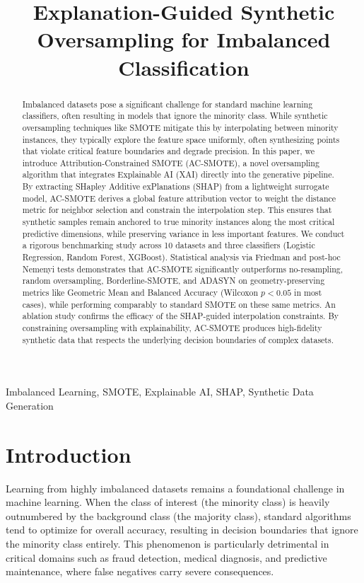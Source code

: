 \documentclass[conference,a4paper]{IEEEtran}
\begin{document}
\title{Explanation-Guided Synthetic Oversampling for Imbalanced Classification}

\author{}

\maketitle

\begin{abstract}
Imbalanced datasets pose a significant challenge for standard machine learning classifiers, often resulting in models that ignore the minority class. While synthetic oversampling techniques like SMOTE mitigate this by interpolating between minority instances, they typically explore the feature space uniformly, often synthesizing points that violate critical feature boundaries and degrade precision. In this paper, we introduce Attribution-Constrained SMOTE (AC-SMOTE), a novel oversampling algorithm that integrates Explainable AI (XAI) directly into the generative pipeline. By extracting SHapley Additive exPlanations (SHAP) from a lightweight surrogate model, AC-SMOTE derives a global feature attribution vector to weight the distance metric for neighbor selection and constrain the interpolation step. This ensures that synthetic samples remain anchored to true minority instances along the most critical predictive dimensions, while preserving variance in less important features. We conduct a rigorous benchmarking study across 10 datasets and three classifiers (Logistic Regression, Random Forest, XGBoost). Statistical analysis via Friedman and post-hoc Nemenyi tests demonstrates that AC-SMOTE significantly outperforms no-resampling, random oversampling, Borderline-SMOTE, and ADASYN on geometry-preserving metrics like Geometric Mean and Balanced Accuracy (Wilcoxon $p < 0.05$ in most cases), while performing comparably to standard SMOTE on these same metrics. An ablation study confirms the efficacy of the SHAP-guided interpolation constraints. By constraining oversampling with explainability, AC-SMOTE produces high-fidelity synthetic data that respects the underlying decision boundaries of complex datasets.
\end{abstract}

\begin{IEEEkeywords}
Imbalanced Learning, SMOTE, Explainable AI, SHAP, Synthetic Data Generation
\end{IEEEkeywords}

\section{Introduction}
Learning from highly imbalanced datasets remains a foundational challenge in machine learning. When the class of interest (the minority class) is heavily outnumbered by the background class (the majority class), standard algorithms tend to optimize for overall accuracy, resulting in decision boundaries that ignore the minority class entirely. This phenomenon is particularly detrimental in critical domains such as fraud detection, medical diagnosis, and predictive maintenance, where false negatives carry severe consequences.
\end{document}

